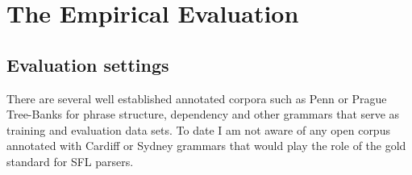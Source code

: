 \chapter{The Empirical Evaluation}
\label{ch:evaluation}

\section{Evaluation settings}

There are several well established annotated corpora such as Penn or Prague Tree-Banks for phrase structure, dependency and other grammars that serve as training and evaluation data sets. To date I am not aware of any open corpus annotated with Cardiff or Sydney grammars that would play the role of the gold standard for SFL parsers. 




